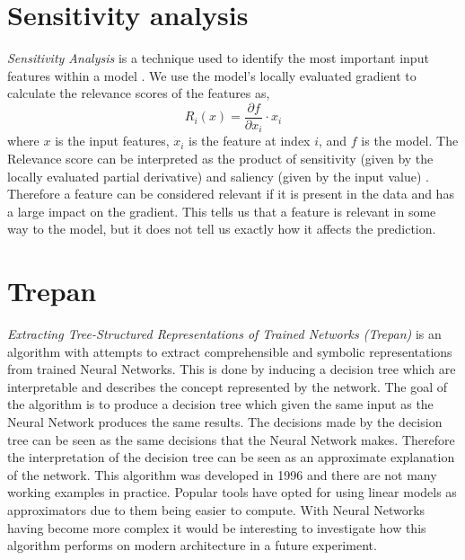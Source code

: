 \section{Sensitivity analysis}
\emph{Sensitivity Analysis} \cite{DBLP:journals/corr/MontavonSM17} is a technique used to identify the most important input features within a model \cite{Zhou2008}. We use the model's locally evaluated gradient to calculate the relevance scores of the features as,
\begin{equation}
    R_{i}(x) = \frac{\partial f}{\partial x_{i}} \cdot x_{i}
\end{equation}
where  $x$ is the input features, $x_{i}$ is the feature at index $i$, and $f$ is the model. The Relevance score can be interpreted as the product of sensitivity (given by the locally evaluated partial derivative) and saliency (given by the input value) \cite{DBLP:journals/corr/MontavonSM17}. Therefore a feature can be considered relevant if it is present in the data and has a large impact on the gradient. This tells us that a feature is relevant in some way to the model, but it does not tell us exactly how it affects the prediction.

\section{Trepan}
\emph{Extracting Tree-Structured Representations of Trained Networks (Trepan)} \cite{Craven1995ExtractingTR} is an algorithm with attempts to extract comprehensible and symbolic representations from trained Neural Networks. This is done by inducing a decision tree \cite{articleb} which are interpretable and describes the concept represented by the network. The goal of the algorithm is to produce a decision tree which given the same input as the Neural Network produces the same results. The decisions made by the decision tree can be seen as the same decisions that the Neural Network makes. Therefore the interpretation of the decision tree can be seen as an approximate explanation of the network.  This algorithm was developed in 1996 and there are not many working examples in practice. Popular tools have opted for using linear models as approximators due to them being easier to compute. With Neural Networks having become more complex it would be interesting to investigate how this algorithm performs on modern architecture in a future experiment.

